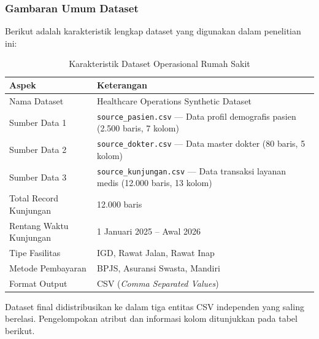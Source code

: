 \subsubsection{Gambaran Umum Dataset}
 
Berikut adalah karakteristik lengkap dataset yang digunakan dalam penelitian ini:
 
\begin{table}[H]
\centering
\caption{Karakteristik Dataset Operasional Rumah Sakit}
\begin{tabularx}{\linewidth}{lX}
\toprule
\textbf{Aspek} & \textbf{Keterangan} \\
\midrule
Nama Dataset            & Healthcare Operations Synthetic Dataset \\
Sumber Data 1           & \texttt{source\_pasien.csv} --- Data profil demografis pasien (2.500 baris, 7 kolom) \\
Sumber Data 2           & \texttt{source\_dokter.csv} --- Data master dokter (80 baris, 5 kolom) \\
Sumber Data 3           & \texttt{source\_kunjungan.csv} --- Data transaksi layanan medis (12.000 baris, 13 kolom) \\
Total Record Kunjungan  & 12.000 baris \\
Rentang Waktu Kunjungan & 1 Januari 2025 -- Awal 2026 \\
Tipe Fasilitas          & IGD, Rawat Jalan, Rawat Inap \\
Metode Pembayaran       & BPJS, Asuransi Swasta, Mandiri \\
Format Output           & CSV (\textit{Comma Separated Values}) \\
\bottomrule
\end{tabularx}
\end{table}
 
Dataset final didistribusikan ke dalam tiga entitas CSV independen yang saling berelasi. Pengelompokan atribut dan informasi kolom ditunjukkan pada tabel berikut.
 
